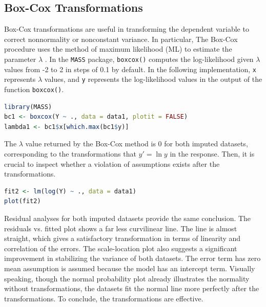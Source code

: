 \documentclass[11pt]{article}
\begin{document}
\subsection{Box-Cox Transformations}
Box-Cox transformations are useful in transforming the dependent variable to correct nonnormality or nonconstant variance. In particular, The Box-Cox procedure uses the method of maximum likelihood (ML) to estimate the parameter $\lambda$ \cite{bk:kutner}. In the \texttt{MASS} package, \texttt{boxcox()} computes the log-likelihood given $\lambda$ values from -2 to 2 in steps of 0.1 by default. In the following implementation, \texttt{x} represents $\lambda$ values, and \texttt{y} represents the log-likelihood values in the output of the function \texttt{boxcox()}.

\begin{file}[project.r]
\begin{lstlisting}[language = R]
library(MASS)
bc1 <- boxcox(Y ~ ., data = data1, plotit = FALSE)
lambda1 <- bc1$x[which.max(bc1$y)]
\end{lstlisting}
\end{file}
The $\lambda$ value returned by the Box-Cox method is 0 for both imputed datasets, corresponding to the transformations that $y'=\ln{y}$ in the response. Then, it is crucial to inspect whether a violation of assumptions exists after the transformations.

\begin{file}[project.r]
\begin{lstlisting}[language = R]
fit2 <- lm(log(Y) ~ ., data = data1)
plot(fit2)
\end{lstlisting}
\end{file}

Residual analyses for both imputed datasets provide the same conclusion. The residuals vs. fitted plot shows a far less curvilinear line. The line is almost straight, which gives a satisfactory transformation in terms of linearity and correlation of the errors. The scale-location plot also suggests a significant improvement in stabilizing the variance of both datasets. The error term has zero mean assumption is assumed because the model has an intercept term. Visually speaking, though the normal probability plot already illustrates the normality without transformations, the datasets fit the normal line more perfectly after the transformations. To conclude, the transformations are effective.
\end{document}
